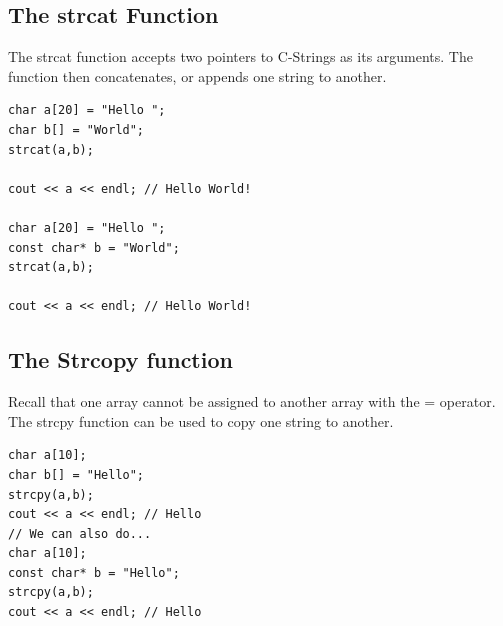 \documentclass{report}
\begin{document}
    \subsection{The strcat Function}
    \bigbreak \noindent 
    The strcat function accepts two pointers to C-Strings as its arguments. The function then concatenates, or appends one string to another.
    \bigbreak \noindent 
    \sepline
    \begin{verbatim}
char a[20] = "Hello ";
char b[] = "World";
strcat(a,b);

cout << a << endl; // Hello World!

char a[20] = "Hello ";
const char* b = "World";
strcat(a,b);

cout << a << endl; // Hello World!
    \end{verbatim}
    \sepline
    \bigbreak \noindent 

    \bigbreak \noindent 
    \subsection{The Strcopy function}
    \bigbreak \noindent 
    Recall that one array cannot be assigned to another array with the = operator. The strcpy function can be used to copy one string to another.
    \bigbreak \noindent 
    \sepline
    \begin{verbatim}
char a[10];
char b[] = "Hello";
strcpy(a,b);
cout << a << endl; // Hello
// We can also do...
char a[10];
const char* b = "Hello";
strcpy(a,b);
cout << a << endl; // Hello
    \end{verbatim}
    \sepline
    \bigbreak \noindent 
    \bigbreak \noindent 

    \pagebreak \bigbreak \noindent 
\end{document}
